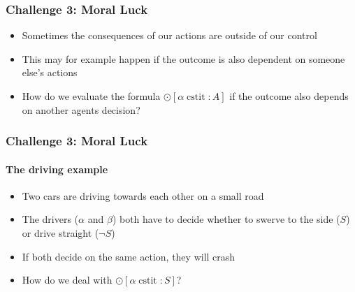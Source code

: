 \documentclass[usenames,dvipsnames]{beamer}
\newcommand{\cstit}{\operatorname{cstit}}
\begin{document}
	\begin{frame}
		\frametitle{Challenge 3: Moral Luck}

		\begin{itemize}
			\item Sometimes the consequences of our actions are outside of our control
			\item This may for example happen if the outcome is also dependent on someone else's actions\pause
			\item How do we evaluate the formula $\odot [\alpha \cstit \colon A]$ if the outcome also depends on another agents decision?
		\end{itemize}
	
	\end{frame}

	\begin{frame}
		\frametitle{Challenge 3: Moral Luck}
		\framesubtitle{The driving example}

		\begin{itemize}
			\item Two cars are driving towards each other on a small road
			\item The drivers ($\alpha$ and $\beta$) both have to decide whether to swerve to the side ($S$) or drive straight ($\lnot S$)\pause
			\item If both decide on the same action, they will crash
			\item How do we deal with $\odot [\alpha \cstit \colon S]$?
		\end{itemize}

		\begin{figure}[ht]
            \centering
\end{figure}
\end{frame}
\end{document}
